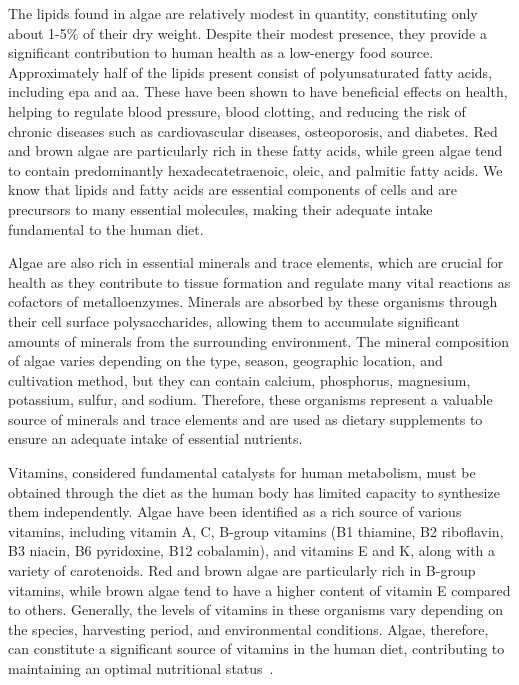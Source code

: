 The lipids found in algae are relatively modest in quantity, constituting only about 1-5\% of their dry weight. Despite their modest presence, they provide a significant contribution to human health as a low-energy food source. Approximately half of the lipids present consist of polyunsaturated fatty acids, including \gls{epa} and \gls{aa}. These have been shown to have beneficial effects on health, helping to regulate blood pressure, blood clotting, and reducing the risk of chronic diseases such as cardiovascular diseases, osteoporosis, and diabetes. Red and brown algae are particularly rich in these fatty acids, while green algae tend to contain predominantly hexadecatetraenoic, oleic, and palmitic fatty acids. We know that lipids and fatty acids are essential components of cells and are precursors to many essential molecules, making their adequate intake fundamental to the human diet.

Algae are also rich in essential minerals and trace elements, which are crucial for health as they contribute to tissue formation and regulate many vital reactions as cofactors of metalloenzymes. Minerals are absorbed by these organisms through their cell surface polysaccharides, allowing them to accumulate significant amounts of minerals from the surrounding environment. The mineral composition of algae varies depending on the type, season, geographic location, and cultivation method, but they can contain calcium, phosphorus, magnesium, potassium, sulfur, and sodium. Therefore, these organisms represent a valuable source of minerals and trace elements and are used as dietary supplements to ensure an adequate intake of essential nutrients.

Vitamins, considered fundamental catalysts for human metabolism, must be obtained through the diet as the human body has limited capacity to synthesize them independently. Algae have been identified as a rich source of various vitamins, including vitamin A, C, B-group vitamins (B1 thiamine, B2 riboflavin, B3 niacin, B6 pyridoxine, B12 cobalamin), and vitamins E and K, along with a variety of carotenoids. Red and brown algae are particularly rich in B-group vitamins, while brown algae tend to have a higher content of vitamin E compared to others. Generally, the levels of vitamins in these organisms vary depending on the species, harvesting period, and environmental conditions. Algae, therefore, can constitute a significant source of vitamins in the human diet, contributing to maintaining an optimal nutritional status~\parencite{tiwari_Seaweed_2015}.

